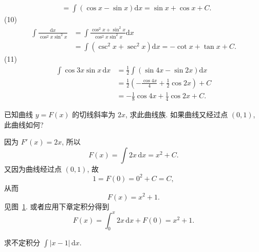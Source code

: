\begin{example}
\begin{align*}
&=\int(\cos x-\sin x)\mathrm{d}x=\sin x+\cos x+C.
\end{align*}
(10)
\begin{align*}
\int\frac{\mathrm{d}x}{\cos^{2}x\sin^{2}x}&=\int\frac{\cos^{2}x+\sin^{2}x}{\cos^{2}x\sin^{2}x}\mathrm{d}x\\
&=\int(\csc^{2}x+\sec^{2}x)\mathrm{d}x=-\cot x+\tan x+C.
\end{align*}
(11)
\begin{align*}
\int\cos 3x\sin x\,\mathrm{d}x&=\frac{1}{2}\int(\sin 4x-\sin 2x)\mathrm{d}x\\
&=\frac{1}{2}\left(-\frac{\cos 4x}{4}+\frac{1}{2}\cos 2x\right)+C\\
&=-\frac{1}{8}\cos 4x+\frac{1}{4}\cos 2x+C.
\end{align*}
\end{example}

\begin{example}\label{ex:5.1.5}
已知曲线 $y=F(x)$ 的切线斜率为 $2x$, 求此曲线族. 如果曲线又经过点 $(0,1)$, 此曲线如何?
\end{example}

\begin{solution}
因为 $F'(x)=2x$, 所以
\[
F(x)=\int 2x\,\mathrm{d}x=x^{2}+C.
\]
又因为曲线经过点 $(0,1)$, 故
\[
1=F(0)=0^{2}+C=C,
\]
从而
\[
F(x)=x^{2}+1.
\]
见图~\ref{fig:5.1.2}. 或者应用下章定积分得到
\[
F(x)=\int_{0}^{x}2x\,\mathrm{d}x+F(0)=x^{2}+1.
\]
\end{solution}

\begin{figure}[htbp]
\centering
{}
\caption{}\label{fig:5.1.2}
\end{figure}

\begin{example}\label{ex:5.1.6}
求不定积分 $\int|x-1|\,\mathrm{d}x$.
\end{example}

